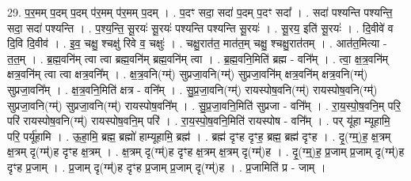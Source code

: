 \documentclass[17pt]{extarticle}
\begin{document}
29. प॒र॒मम् प॒दम् प॒दम् प॑र॒मम् प॑र॒मम् प॒दम् । . प॒दꣳ सदा॒ सदा॑ प॒दम् प॒दꣳ सदा᳚ । . सदा॑ पश्यन्ति पश्यन्ति॒ सदा॒ सदा॑ पश्यन्ति । . प॒श्य॒न्ति॒ सू॒रयः॑ सू॒रयः॑ पश्यन्ति पश्यन्ति सू॒रयः॑ । . सू॒रय॒ इति॑ सू॒रयः॑ । . दि॒वीवे॑ व दि॒वि दि॒वीव॑ । . इ॒व॒ चक्षु॒ श्चक्षु॑ रिवे व॒ चक्षुः॑ । . चक्षु॒रात॑त॒ मात॑त॒म् चक्षु॒ श्चक्षु॒रात॑तम् । . आत॑त॒मित्या - त॒त॒म् । . ब्र॒ह्म॒वनि॑म् त्वा त्वा ब्रह्म॒वनि॑म् ब्रह्म॒वनि॑म् त्वा । . ब्र॒ह्म॒वनि॒मिति॑ ब्रह्म - वनि᳚म् । . त्वा॒ क्ष॒त्र॒वनि॑म् क्षत्र॒वनि॑म् त्वा त्वा क्षत्र॒वनि᳚म् । . क्ष॒त्र॒वनि(ग्म्॑) सुप्रजा॒वनि(ग्म्॑) सुप्रजा॒वनि॑म् क्षत्र॒वनि॑म् क्षत्र॒वनि(ग्म्॑) सुप्रजा॒वनि᳚म् । . क्ष॒त्र॒वनि॒मिति॑ क्षत्र - वनि᳚म् । . सु॒प्र॒जा॒वनि(ग्म्॑) रायस्पोष॒वनि(ग्म्॑) रायस्पोष॒वनि(ग्म्॑) सुप्रजा॒वनि(ग्म्॑) सुप्रजा॒वनि(ग्म्॑) रायस्पोष॒वनि᳚म् । . सु॒प्र॒जा॒वनि॒मिति॑ सुप्रजा - वनि᳚म् । . रा॒य॒स्पो॒ष॒वनि॒म् परि॒ परि॑ रायस्पोष॒वनि(ग्म्॑) रायस्पोष॒वनि॒म् परि॑ । . रा॒य॒स्पो॒ष॒वनि॒मिति॑ रायस्पोष - वनि᳚म् । . पर् यू॑हा म्यूहामि॒ परि॒ पर्यू॑हामि । . ऊ॒हा॒मि॒ ब्रह्म॒ ब्रह्मो॑ हाम्यूहामि॒ ब्रह्म॑ । . ब्रह्म॑ दृꣳह दृꣳह॒ ब्रह्म॒ ब्रह्म॑ दृꣳह । . दृ॒(ग्म्॒)ह॒ क्ष॒त्रम् क्ष॒त्रम् दृ(ग्म्॑)ह दृꣳह क्ष॒त्रम् । . क्ष॒त्रम् दृ(ग्म्॑)ह दृꣳह क्ष॒त्रम् क्ष॒त्रम् दृ(ग्म्॑)ह । . दृ॒(ग्म्॒)ह॒ प्र॒जाम् प्र॒जाम् दृ(ग्म्॑)ह दृꣳह प्र॒जाम् । . प्र॒जाम् दृ(ग्म्॑)ह दृꣳह प्र॒जाम् प्र॒जाम् दृ(ग्म्॑)ह । . प्र॒जामिति॑ प्र - जाम् । \newline
\end{document}
